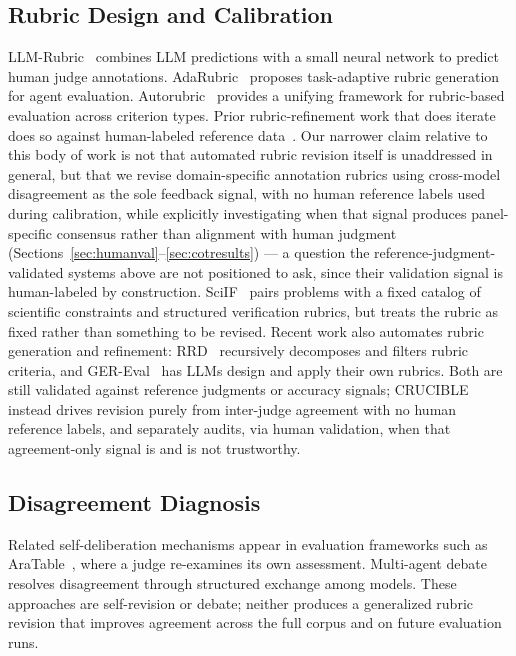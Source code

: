 \documentclass[11pt]{article}
\begin{document}
\subsection{Rubric Design and Calibration}

LLM-Rubric~\cite{hashemi2024llmrubric} combines LLM predictions with a small
neural network to predict human judge annotations. AdaRubric~\cite{adarubric2026}
proposes task-adaptive rubric generation for agent evaluation.
Autorubric~\cite{autorubric2026} provides a unifying framework for rubric-based
evaluation across criterion types. Prior
rubric-refinement work that does iterate does so against human-labeled reference
data~\cite{patch2025rubric}. Our narrower claim relative to this body of
work is not that automated rubric revision itself is unaddressed in
general, but that we revise domain-specific annotation rubrics using
cross-model disagreement as the sole feedback signal, with no human reference labels used during calibration, while explicitly investigating when that
signal produces panel-specific consensus rather than alignment with human
judgment (Sections~\ref{sec:humanval}--\ref{sec:cotresults}) --- a question
the reference-judgment-validated systems above are not positioned to ask,
since their validation signal is human-labeled by construction.
SciIF~\cite{sciif2026} pairs problems with a fixed catalog of scientific constraints and structured
verification rubrics, but treats the rubric as fixed rather than something to be revised.
Recent work also automates rubric generation and refinement: RRD~\cite{shen2026rrd} recursively
decomposes and filters rubric criteria, and GER-Eval~\cite{siro2026ger} has LLMs design and apply their
own rubrics. Both are still validated against reference judgments or accuracy signals; CRUCIBLE instead
drives revision purely from inter-judge agreement with no human reference labels, and separately
audits, via human validation, when that agreement-only signal is and is not trustworthy.

\subsection{Disagreement Diagnosis}

Related self-deliberation mechanisms appear in evaluation frameworks such as
AraTable~\cite{aratable2025}, where a judge re-examines its own
assessment. Multi-agent debate~\cite{du2023improving} resolves disagreement through structured exchange
among models. These approaches are self-revision or debate; neither produces a generalized rubric revision that
improves agreement across the full corpus and on future evaluation runs.
\end{document}

